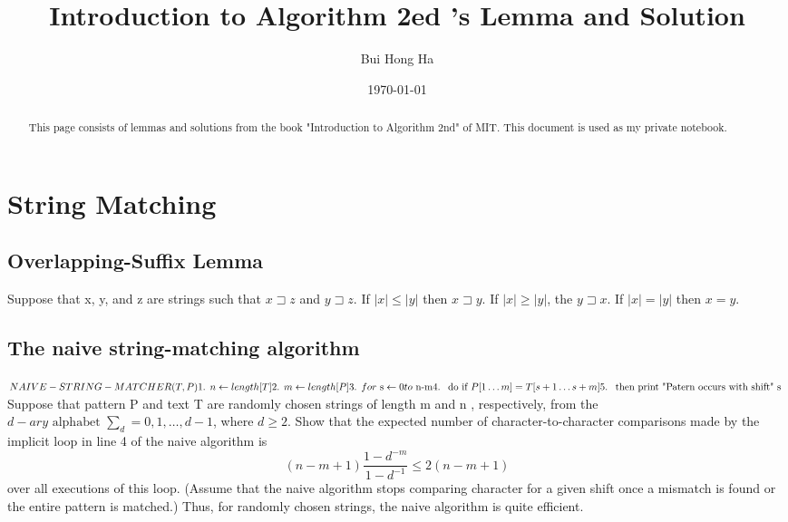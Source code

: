 \documentclass[12pt]{article}
\title{Introduction to Algorithm 2ed 's Lemma and Solution}
\author{Bui Hong Ha}
\date{\today}
\begin{document}
\maketitle

\begin{abstract}
This page consists of lemmas and solutions from the book "Introduction to Algorithm 2nd" of MIT. This document is used as my private notebook.

\end{abstract}

\tableofcontents

\section{String Matching}
	\subsection{Overlapping-Suffix Lemma}
	Suppose that x, y, and z are strings such that $x \sqsupset z$ and $y \sqsupset z$. If $|x| \leq |y|$ then $x \sqsupset y$. If $|x| \geq |y|$, the $y \sqsupset x$. If $|x| = |y|$ then $x = y$.

	\subsection{The naive string-matching algorithm}
	$
	NAIVE-STRING-MATCHER(T,P)\\
	\mbox{1. } n \leftarrow length[T]\\
	\mbox{2. } m \leftarrow length[P] \\
	\mbox{3. } for \mbox{ s} \leftarrow 0 to \mbox{ n-m} \\ 
	\mbox{4. }\mbox{       do if } P[1 \ldots m] = T[s+1 \ldots s+m] \\
	\mbox{5.  }\mbox{      then print "Patern occurs with shift" s }\\
	$ \\
	Suppose that pattern P and text T are randomly chosen strings of length m and n , respectively, from the $ d-ary \mbox{ alphabet } \sum_{d} = {0,1,\ldots,d-1} $, where $ d \geq 2 $. Show that the expected number of character-to-character comparisons made by the implicit loop in line 4 of the naive algorithm is \\
$$(n-m+1)\frac{1-d^{-m}}{1-d^{-1}} \leq 2(n-m+1)$$
over all executions of this loop. (Assume that the naive algorithm stops comparing character for a given shift once a mismatch is found or the entire pattern is matched.) Thus, for randomly chosen strings, the naive algorithm is quite efficient.
			
\end{document}
